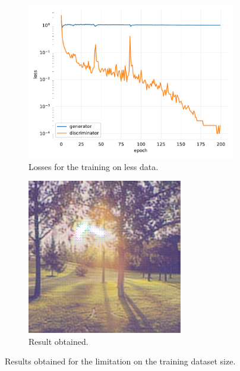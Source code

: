 \documentclass[twocolumn,superscriptaddress,aps,floatfix,nofootinbib]{revtex4-1}
\begin{document}
    \begin{figure}[ht]
        \centering
        \begin{subfigure}[b]{0.22\textwidth}
            \centering
            \includegraphics[width=\textwidth]{resources/png/gan-losses/testless.pdf}
            \caption{Losses for the training on less data.}
        \end{subfigure}
        \hfill
        \begin{subfigure}[b]{0.22\textwidth}
            \centering
            \includegraphics[width=\textwidth]{resources/png/gan-results/less1.png.png}
            \caption{Result obtained.}
            \label{fig:less1}
        \end{subfigure}
        \caption{Results obtained for the limitation on the training dataset size.}
    \end{figure}
    
\end{document}
